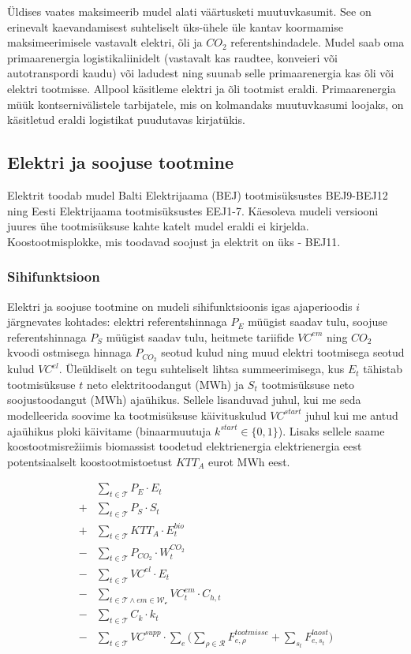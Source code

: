\documentclass[10pt,a4paper]{article}
\begin{document}
Üldises vaates maksimeerib mudel alati väärtusketi muutuvkasumit. See on erinevalt kaevandamisest suhteliselt üks-ühele üle kantav koormamise maksimeerimisele vastavalt elektri, õli ja $CO_2$ referentshindadele. Mudel saab oma primaarenergia logistikaliinidelt (vastavalt kas raudtee, konveieri või autotranspordi kaudu) või ladudest ning suunab selle primaarenergia kas õli või elektri tootmisse. Allpool käsitleme elektri ja õli tootmist eraldi. Primaarenergia müük kontsernivälistele tarbijatele, mis on kolmandaks muutuvkasumi loojaks, on käsitletud eraldi logistikat puudutavas kirjatükis.

\subsection{Elektri ja soojuse tootmine}
Elektrit toodab mudel Balti Elektrijaama (BEJ) tootmisüksustes BEJ9-BEJ12 ning Eesti Elektrijaama tootmisüksustes EEJ1-7. Käesoleva mudeli versiooni juures ühe tootmisüksuse kahte katelt mudel eraldi ei kirjelda. Koostootmisplokke, mis toodavad soojust ja elektrit on üks - BEJ11.

\subsubsection{Sihifunktsioon}
Elektri ja soojuse tootmine on mudeli sihifunktsioonis igas ajaperioodis $i$ järgne\-vates kohtades: elektri referentshinnaga $P_E$ müügist saadav tulu, soojuse referentshinnaga $P_S$ müügist saadav tulu, heitmete tariifide $\mathit{VC}^{em}$ ning $CO_2$ kvoodi ostmisega hinnaga $P_{CO_2}$ seotud kulud ning muud elektri tootmisega seotud kulud $\mathit{VC}^{el}$. Üleüldiselt on tegu suhteliselt lihtsa summeerimisega, kus $E_t$ tähistab tootmisüksuse $t$ neto elektritoodangut (MWh) ja $S_t$ tootmisüksuse neto soojustoodangut (MWh) ajaühikus. Sellele lisanduvad juhul, kui me seda modelleerida soovime ka tootmisüksuse käivituskulud $VC^{start}$ juhul kui me antud ajaühikus ploki käivitame (binaarmuutuja $k^{start} \in \{0,1\}$). Lisaks sellele saame koostootmisrežiimis biomassist toodetud elektrienergia elektrienergia eest potentsiaalselt koostootmistoetust $KTT_A$ eurot MWh eest.

\begin{align}
  & \sum_{t\in\mathcal{T} } \mathit{P_E} \cdot E_{t} \\
+ & \sum_{t\in\mathcal{T} } \mathit{P_S} \cdot S_{t} \\
+ & \sum_{t\in\mathcal{T} } KTT_{A} \cdot E^{bio}_{t} \\
- & \sum_{t\in\mathcal{T} } P_{CO_2} \cdot W^{CO_2}_t \\
- & \sum_{t\in\mathcal{T} } \mathit{VC}^{el} \cdot E_{t} \\
- & \sum_{t\in\mathcal{T} \land em\in \mathcal{W_e}} \mathit{VC}^{em}_t \cdot C_{h,t} \\
- & \sum_{t\in\mathcal{T} } C_{k} \cdot k_t  \\
- & \sum_{t\in\mathcal{T} } \mathit{VC}^{supp} \cdot \sum_e \big( \sum_{\rho\in\mathcal{R}} F^{tootmisse}_{e,\rho} + \sum_{s_t} F^{laost}_{e,s_t}\big) 
\end{align}
\end{document}
